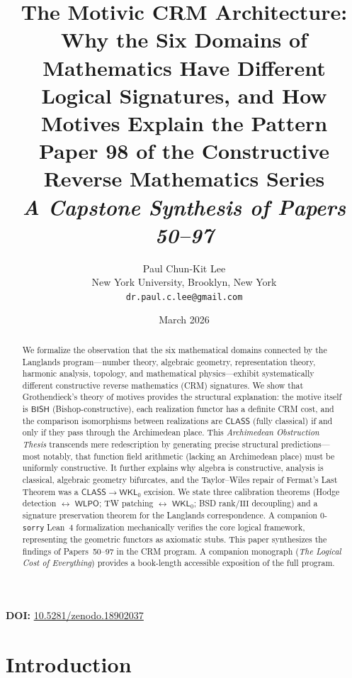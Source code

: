 \documentclass[11pt,a4paper]{article}
\title{\textbf{The Motivic CRM Architecture:\\
Why the Six Domains of Mathematics Have Different\\
Logical Signatures, and How Motives Explain the Pattern}\\[6pt]
\large Paper 98 of the Constructive Reverse Mathematics Series\\[6pt]
\normalsize\textit{A Capstone Synthesis of Papers 50--97}}
\author{Paul Chun-Kit Lee\\
\small New York University, Brooklyn, New York\\
\small\texttt{dr.paul.c.lee@gmail.com}}
\date{March 2026}
\newcommand{\Sha}{\mathrm{III}}
\theoremstyle{plain}
\theoremstyle{definition}
\newcommand{\BISH}{\textsf{BISH}}
\newcommand{\WKL}{\textsf{WKL}_0}
\newcommand{\WLPO}{\textsf{WLPO}}
\newcommand{\CLASS}{\textsf{CLASS}}
\begin{document}
\maketitle

\noindent\textbf{DOI:} \href{https://doi.org/10.5281/zenodo.18902037}{10.5281/zenodo.18902037}
\begin{abstract}
We formalize the observation that the six mathematical domains connected by the Langlands program---number theory, algebraic geometry, representation theory, harmonic analysis, topology, and mathematical physics---exhibit systematically different constructive reverse mathematics (CRM) signatures. We show that Grothendieck's theory of motives provides the structural explanation: the motive itself is $\BISH$ (Bishop-constructive), each realization functor has a definite CRM cost, and the comparison isomorphisms between realizations are $\CLASS$ (fully classical) if and only if they pass through the Archimedean place. This \emph{Archimedean Obstruction Thesis} transcends mere redescription by generating precise structural predictions---most notably, that function field arithmetic (lacking an Archimedean place) must be uniformly constructive. It further explains why algebra is constructive, analysis is classical, algebraic geometry bifurcates, and the Taylor--Wiles repair of Fermat's Last Theorem was a $\CLASS \to \WKL$ excision. We state three calibration theorems (Hodge detection $\leftrightarrow$ $\WLPO$; TW patching $\leftrightarrow$ $\WKL$; BSD rank/$\Sha$ decoupling) and a signature preservation theorem for the Langlands correspondence. A companion 0-\texttt{sorry} Lean~4 formalization mechanically verifies the core logical framework, representing the geometric functors as axiomatic stubs. This paper synthesizes the findings of Papers~50--97 in the CRM program. A companion monograph (\emph{The Logical Cost of Everything}) provides a book-length accessible exposition of the full program.
\end{abstract}

\tableofcontents
\newpage

\section{Introduction}\label{sec:intro}
\end{document}
